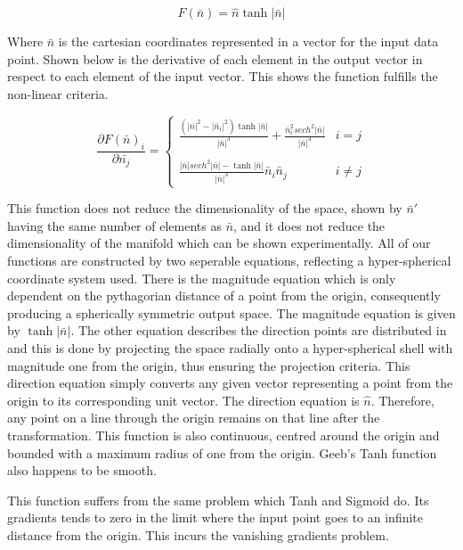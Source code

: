 \documentclass[onecolumn]{article}
\begin{document}
    \begin{equation}
        \label{eqn: Geebs' Tanh Function} 
        F\left(\bar{n}\right)=\hat{n}\tanh|\bar{n}|
    \end{equation}

    Where $\bar{n}$ is the cartesian coordinates represented in a vector for the input data point. Shown below is the derivative of each element in the output vector in respect to each element of the input vector. This shows the function fulfills the non-linear criteria.

    \[\frac{\partial F\left(\bar{n}\right)_{i}}{\partial \bar{n_{j}}}=\left\{
    \begin{array}{ll}
        \frac{\left(|\bar{n}|^{2}-|\bar{n}_{i}|^{2}\right)\tanh|\bar{n}|}{|\bar{n}|^{3}} + \frac{\bar{n}_{i}^{2}sech^{2}|\bar{n}|}{|\bar{n}|^{3}} & i = j \\\\
        \frac{|\bar{n}|sech^{2}|\bar{n}|-\tanh|\bar{n}|}{|\bar{n}|^{3}}\bar{n}_{i}\bar{n}_{j} & i \neq j
    \end{array} 
    \right. \]

    This function does not reduce the dimensionality of the space, shown by $\bar{n}'$ having the same number of elements as $\bar{n}$, and it does not reduce the dimensionality of the manifold which can be shown experimentally. All of our functions are constructed by two seperable equations, reflecting a hyper-spherical coordinate system used. There is the magnitude equation which is only dependent on the pythagorian distance of a point from the origin, consequently producing a spherically symmetric output space. The magnitude equation is given by $\tanh|\bar{n}|$. The other equation describes the direction points are distributed in and this is done by projecting the space radially onto a hyper-spherical shell with magnitude one from the origin, thus ensuring the projection criteria. This direction equation simply converts any given vector representing a point from the origin to its corresponding unit vector. The direction equation is $\hat{n}$. Therefore, any point on a line through the origin remains on that line after the transformation. This function is also continuous, centred around the origin and bounded with a maximum radius of one from the origin. Geeb's Tanh function also happens to be smooth.
    
    This function suffers from the same problem which Tanh and Sigmoid do. Its gradients tends to zero in the limit where the input point goes to an infinite distance from the origin. This incurs the vanishing gradients problem.
\end{document}
